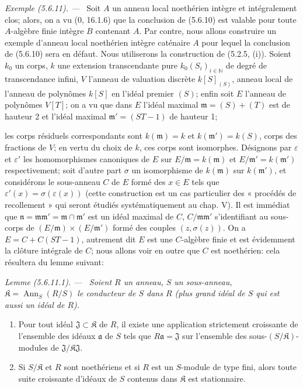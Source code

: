 \documentclass[10pt,oneside]{book}
\makeatletter
\newcommand{\oldpage}[2][]{%
  \setcounter{footnote}{0}%
  \marginpar{\scriptsize\textbf{#1}~|~#2}\ignorespaces}
\newenvironment{example}[1][]{%
  \par\medskip\noindent\textit{Exemple (#1). ---\ }}{\par}
\newenvironment{lemma}[1][]{%
  \par\medskip\noindent\itshape Lemme (#1). ---\ }{\par}
\newcommand{\EGAReaderTarget}[2]{\hypertarget{#1}{}\@bsphack\begingroup\def\@currentHref{#1}\label{#2}\endgroup\@esphack}
\makeatother
\begin{document}
\begin{example}[5.6.11]
\label{IV.2.s5.6.11-fr}
Soit $A$ un anneau local noethérien intègre et intégralement clos; alors, on
a vu (0, 16.1.6) que la conclusion de (5.6.10) est valable pour toute
$A$-algèbre finie intègre $B$ contenant $A$. Par contre, nous allons
construire un exemple d'anneau local noethérien intègre caténaire $A$ pour
lequel la conclusion de (5.6.10) sera en défaut. Nous utiliserons la
construction de (5.2.5, (i)). Soient $k_0$ un corps, $k$ une extension
transcendante pure $k_0(S_i)_{i\in\mathbb N}$ de degré de transcendance
infini, $V$ l'anneau de valuation discrète $k[S]_{(S)}$, anneau local de
l'anneau de polynômes $k[S]$ en l'idéal premier $(S)$; enfin soit $E$
l'anneau de polynômes $V[T]$; on a vu que dans $E$ l'idéal maximal
$\mathfrak m=(S)+(T)$ est de hauteur 2 et l'idéal maximal
$\mathfrak m'=(ST-1)$ de hauteur 1;

\oldpage[IV-2]{102}

les corps résiduels correspondants sont $k(\mathfrak m)=k$ et
$k(\mathfrak m')=k(S)$, corps des fractions de $V$; en vertu du choix de
$k$, ces corps sont isomorphes. Désignons par $\varepsilon$ et
$\varepsilon'$ les homomorphismes canoniques de $E$ sur
$E/\mathfrak m=k(\mathfrak m)$ et $E/\mathfrak m'=k(\mathfrak m')$
respectivement; soit d'autre part $\sigma$ un isomorphisme de
$k(\mathfrak m)$ sur $k(\mathfrak m')$, et considérons le sous-anneau $C$
de $E$ formé des $x\in E$ tels que
$\varepsilon'(x)=\sigma(\varepsilon(x))$ (cette construction est un cas
particulier des « procédés de recollement » qui seront étudiés
systématiquement au chap. V). Il est immédiat que
$\mathfrak n=\mathfrak m\mathfrak m'=\mathfrak m\cap\mathfrak m'$ est un
idéal maximal de $C$, $C/\mathfrak m\mathfrak m'$ s'identifiant au
sous-corps de $(E/\mathfrak m)\times(E/\mathfrak m')$ formé des couples
$(z,\sigma(z))$. On a $E=C+C(ST-1)$, autrement dit $E$ est une
$C$-algèbre finie et est évidemment la clôture intégrale de $C$; nous allons
voir en outre que $C$ est noethérien: cela résultera du lemme suivant:

\begin{lemma}[5.6.11.1]
\EGAReaderTarget{ega4.c04.lem.5-6-11-1}{IV.2.s5.6.11.1-fr}
Soient $R$ un anneau, $S$ un sous-anneau,
$\mathfrak K=\operatorname{Ann}_S(R/S)$ le conducteur de $S$ dans $R$
(plus grand idéal de $S$ qui est aussi un idéal de $R$).
\begin{enumerate}
\item[(i)] Pour tout idéal $\mathfrak J\subset\mathfrak K$ de $R$, il existe
une application strictement croissante de l'ensemble des idéaux
$\mathfrak a$ de $S$ tels que $R\mathfrak a=\mathfrak J$ sur l'ensemble des
sous-$(S/\mathfrak K)$-modules de
$\mathfrak J/\mathfrak K\mathfrak J$.
\item[(ii)] Si $S/\mathfrak K$ et $R$ sont noethériens et si $R$ est un
$S$-module de type fini, alors toute suite croissante d'idéaux de $S$
contenus dans $\mathfrak K$ est stationnaire.
\end{enumerate}
\end{lemma}


\end{example}
\end{document}
